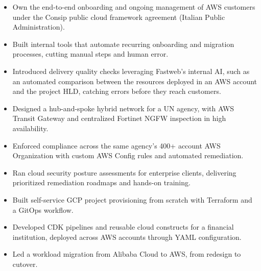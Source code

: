 \documentclass[10pt,a4paper]{altacv}
\begin{document}

\begin{fullwidth}
\makecvheader
\end{fullwidth}


\begin{itemize}
\item Own the end-to-end onboarding and ongoing management of AWS customers under the Consip public cloud framework agreement (Italian Public Administration).
\item Built internal tools that automate recurring onboarding and migration processes, cutting manual steps and human error.
\item Introduced delivery quality checks leveraging Fastweb's internal AI, such as an automated comparison between the resources deployed in an AWS account and the project HLD, catching errors before they reach customers.
\end{itemize}

\begin{itemize}
\item Designed a hub-and-spoke hybrid network for a UN agency, with AWS Transit Gateway and centralized Fortinet NGFW inspection in high availability.
\item Enforced compliance across the same agency's 400+ account AWS Organization with custom AWS Config rules and automated remediation.
\item Ran cloud security posture assessments for enterprise clients, delivering prioritized remediation roadmaps and hands-on training.
\item Built self-service GCP project provisioning from scratch with Terraform and a GitOps workflow.
\item Developed CDK pipelines and reusable cloud constructs for a financial institution, deployed across AWS accounts through YAML configuration.
\item Led a workload migration from Alibaba Cloud to AWS, from redesign to cutover.
\end{itemize}
\end{document}
